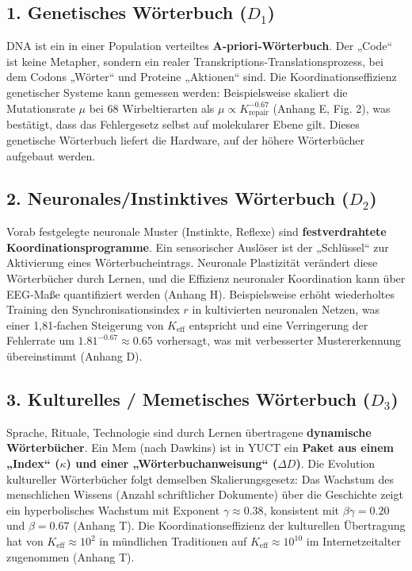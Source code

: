 \documentclass[12pt,a4paper]{article}
\newcommand{\eff}{\mathrm{eff}}
\newcommand{\Ke}{K_{\eff}}
\begin{document}
	\subsection{1. Genetisches Wörterbuch ($D_1$)}
	
	DNA ist ein in einer Population verteiltes \textbf{A‑priori‑Wörterbuch}. Der „Code“ ist keine Metapher, sondern ein realer Transkriptions‑Translationsprozess, bei dem Codons „Wörter“ und Proteine „Aktionen“ sind. Die Koordinationseffizienz genetischer Systeme kann gemessen werden: Beispielsweise skaliert die Mutationsrate $\mu$ bei 68 Wirbeltierarten als $\mu \propto K_{\text{repair}}^{-0.67}$ (Anhang E, Fig. 2), was bestätigt, dass das Fehlergesetz selbst auf molekularer Ebene gilt. Dieses genetische Wörterbuch liefert die Hardware, auf der höhere Wörterbücher aufgebaut werden.
	
	\subsection{2. Neuronales/Instinktives Wörterbuch ($D_2$)}
	
	Vorab festgelegte neuronale Muster (Instinkte, Reflexe) sind \textbf{festverdrahtete Koordinationsprogramme}. Ein sensorischer Auslöser ist der „Schlüssel“ zur Aktivierung eines Wörterbucheintrags. Neuronale Plastizität verändert diese Wörterbücher durch Lernen, und die Effizienz neuronaler Koordination kann über EEG‑Maße quantifiziert werden (Anhang H). Beispielsweise erhöht wiederholtes Training den Synchronisationsindex $r$ in kultivierten neuronalen Netzen, was einer 1,81‑fachen Steigerung von $\Ke$ entspricht und eine Verringerung der Fehlerrate um $1.81^{-0.67} \approx 0.65$ vorhersagt, was mit verbesserter Mustererkennung übereinstimmt (Anhang D).
	
	\subsection{3. Kulturelles / Memetisches Wörterbuch ($D_3$)}
	
	Sprache, Rituale, Technologie sind durch Lernen übertragene \textbf{dynamische Wörterbücher}. Ein Mem (nach Dawkins) ist in YUCT ein \textbf{Paket aus einem „Index“ ($\kappa$) und einer „Wörterbuchanweisung“ ($\Delta D$)}. Die Evolution kultureller Wörterbücher folgt demselben Skalierungsgesetz: Das Wachstum des menschlichen Wissens (Anzahl schriftlicher Dokumente) über die Geschichte zeigt ein hyperbolisches Wachstum mit Exponent $\gamma \approx 0.38$, konsistent mit $\beta\gamma = 0.20$ und $\beta = 0.67$ (Anhang T). Die Koordinationseffizienz der kulturellen Übertragung hat von $\Ke \approx 10^2$ in mündlichen Traditionen auf $\Ke \approx 10^{10}$ im Internetzeitalter zugenommen (Anhang T).
	
\end{document}

